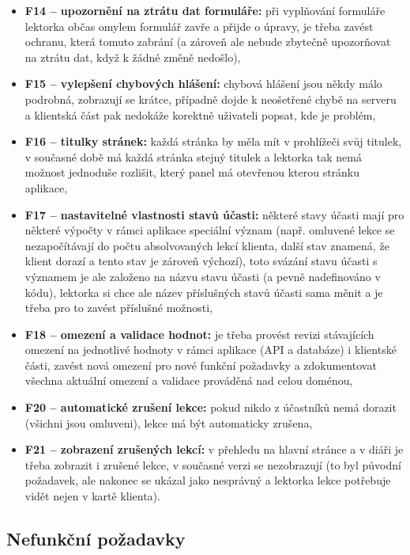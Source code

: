 \begin{itemize}
    \item \textbf{F14 -- upozornění na ztrátu dat formuláře:} při vyplňování formuláře lektorka občas omylem formulář zavře a přijde o úpravy, je třeba zavést ochranu, která tomuto zabrání (a zároveň ale nebude zbytečně upozorňovat na ztrátu dat, když k žádné změně nedošlo),
    \item \textbf{F15 -- vylepšení chybových hlášení:} chybová hlášení jsou někdy málo podrobná, zobrazují se krátce, případně dojde k neošetřené chybě na serveru a klientská část pak nedokáže korektně uživateli popsat, kde je problém,
    \item \textbf{F16 -- titulky stránek:} každá stránka by měla mít v prohlížeči svůj titulek, v současné době má každá stránka stejný titulek a lektorka tak nemá možnost jednoduše rozlišit, který panel má otevřenou kterou stránku aplikace,
    \item \textbf{F17 -- nastavitelné vlastnosti stavů účasti:} některé stavy účasti mají pro některé výpočty v rámci aplikace speciální význam (např. omluvené lekce se nezapočítávají do počtu absolvovaných lekcí klienta, další stav znamená, že klient dorazí a tento stav je zároveň výchozí), toto svázání stavu účasti s významem je ale založeno na názvu stavu účasti (a pevně nadefinováno v kódu), lektorka si chce ale název příslušných stavů účasti sama měnit a je třeba pro to zavést příslušné možnosti,
    \item \textbf{F18 -- omezení a validace hodnot:} je třeba provést revizi stávajících omezení na jednotlivé hodnoty v rámci aplikace (API a databáze) i klientské části, zavést nová omezení pro nové funkční požadavky a zdokumentovat všechna aktuální omezení a validace prováděná nad celou doménou,
    \item \textbf{F20 -- automatické zrušení lekce:} pokud nikdo z účastníků nemá dorazit (všichni jsou omluveni), lekce má být automaticky zrušena,
    \item \textbf{F21 -- zobrazení zrušených lekcí:} v přehledu na hlavní stránce a v diáři je třeba zobrazit i zrušené lekce, v současné verzi se nezobrazují (to byl původní požadavek, ale nakonec se ukázal jako nesprávný a lektorka lekce potřebuje vidět nejen v kartě klienta).
\end{itemize}

\subsection{Nefunkční požadavky}

